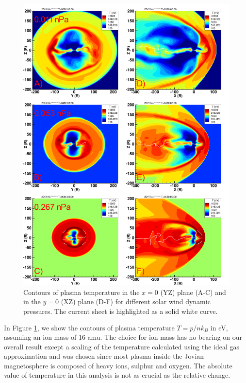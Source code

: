 \begin{figure}
    \centering
    \includegraphics[height=0.9\textheight]{images5/compare_runs_currentsheet_Temperature.png}
    \caption{Contours of plasma temperature in the $x=0$ (YZ) plane (A-C) and in the $y=0$ (XZ) plane (D-F) for different solar wind dynamic pressures. The current sheet is highlighted as a solid white curve.}
    \label{fig:chp5-comparison-slices-temperature}
\end{figure}

In Figure \ref{fig:chp5-comparison-slices-temperature}, we show the contours of plasma temperature $T = p/nk_B$ in eV, assuming an ion mass of 16 amu. The choice for ion mass has no bearing on our overall result except a scaling of the temperature calculated using the ideal gas approximation and was chosen since most plasma inside the Jovian magnetosphere is composed of heavy ions, sulphur and oxygen. The absolute value of temperature in this analysis is not as crucial as the relative change. 

